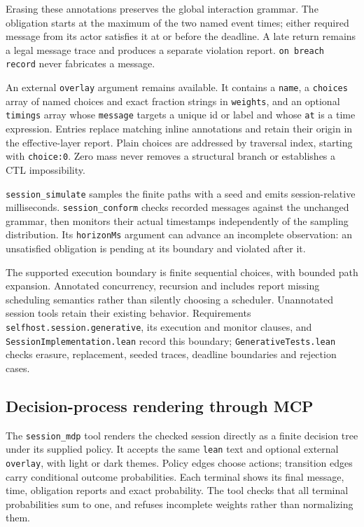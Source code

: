 

Erasing these annotations preserves the global interaction grammar. The
obligation starts at the maximum of the two named event times; either required
message from its actor satisfies it at or before the deadline. A late return
remains a legal message trace and produces a separate violation report.
\texttt{on breach record} never fabricates a message.

An external \texttt{overlay} argument remains available. It contains a
\texttt{name}, a \texttt{choices} array of named choices and exact fraction
strings in \texttt{weights}, and an optional \texttt{timings} array whose
\texttt{message} targets a unique id or label and whose \texttt{at} is a time
expression. Entries replace matching inline annotations and retain their
origin in the effective-layer report. Plain choices are addressed by traversal
index, starting with \texttt{choice:0}. Zero mass never removes a structural
branch or establishes a CTL impossibility.

\texttt{session\_simulate} samples the finite paths with a seed and emits
session-relative milliseconds. \texttt{session\_conform} checks recorded
messages against the unchanged grammar, then monitors their actual timestamps
independently of the sampling distribution. Its \texttt{horizonMs} argument
can advance an incomplete observation: an unsatisfied obligation is pending
at its boundary and violated after it.

The supported execution boundary is finite sequential choices, with bounded
path expansion. Annotated concurrency, recursion and includes report missing
scheduling semantics rather than silently choosing a scheduler. Unannotated
session tools retain their existing behavior. Requirements
\texttt{selfhost.session.generative}, its execution and monitor clauses,
and \texttt{SessionImplementation.lean} record this boundary;
\texttt{GenerativeTests.lean} checks erasure, replacement, seeded traces,
deadline boundaries and rejection cases.


\subsection{Decision-process rendering through MCP}

The \texttt{session\_mdp} tool renders the checked session directly as a finite
decision tree under its supplied policy. It accepts the same \texttt{lean}
text and optional external \texttt{overlay}, with light or dark themes.
Policy edges choose actions; transition edges carry conditional outcome
probabilities. Each terminal shows its final message, time, obligation reports
and exact probability. The tool checks that all terminal probabilities sum
to one, and refuses incomplete weights rather than normalizing them.

